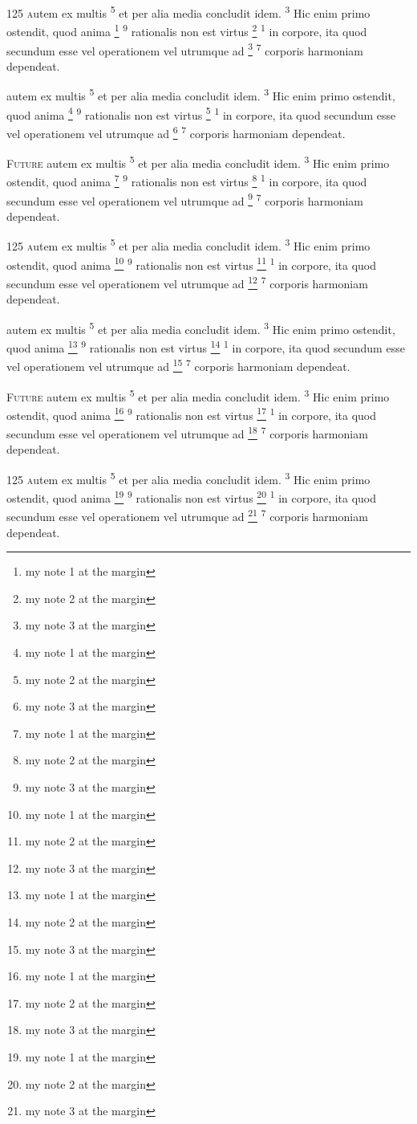 \documentclass[twoside,12pt]{book}
\newcommand{\blGetVerse}[1]{%
\setcounter{footnote}{0}%
\textsuperscript{#1}%
}
\newcommand{\blGetVerseX}[2]{%
\footnote{#2}\blGetVerse{#1}%
}
\newcommand{\blIniChar}[1]{%
\blSetAcorn\selectfont{#1}%
}
\newcommand{\blIniWord}[1]{%
\blSetRothenburgDecorative\selectfont{#1}%
}
\newcommand{\blIniNum}[1]{%
\blSetDSRomantiques\selectfont{#1}%
}
\begin{document}
\lettrine{125 }
autem ex multis \blGetVerse{5}et per alia media concludit idem. \blGetVerse{3}Hic enim primo ostendit, quod anima \blGetVerseX{9}{my note 1 at the margin}rationalis 
non est virtus \blGetVerseX{1}{my note 2 at the margin}in corpore, ita quod secundum esse vel
operationem vel utrumque ad \blGetVerseX{7}{my note 3 at the margin}corporis harmoniam dependeat.

\lettrine{\blIniChar{FU}}{\blIniWord{turo}}
autem ex multis \blGetVerse{5}et per alia media concludit idem. \blGetVerse{3}Hic enim primo ostendit, quod anima \blGetVerseX{9}{my note 1 at the margin}rationalis 
non est virtus \blGetVerseX{1}{my note 2 at the margin}in corpore, ita quod secundum esse vel
operationem vel utrumque ad \blGetVerseX{7}{my note 3 at the margin}corporis harmoniam dependeat.

\lettrine{\blIniNum{150}}{Future}
autem ex multis \blGetVerse{5}et per alia media concludit idem. \blGetVerse{3}Hic enim primo ostendit, quod anima \blGetVerseX{9}{my note 1 at the margin}rationalis 
non est virtus \blGetVerseX{1}{my note 2 at the margin}in corpore, ita quod secundum esse vel
operationem vel utrumque ad \blGetVerseX{7}{my note 3 at the margin}corporis harmoniam dependeat.

\lettrine{125 }
autem ex multis \blGetVerse{5}et per alia media concludit idem. \blGetVerse{3}Hic enim primo ostendit, quod anima \blGetVerseX{9}{my note 1 at the margin}rationalis 
non est virtus \blGetVerseX{1}{my note 2 at the margin}in corpore, ita quod secundum esse vel
operationem vel utrumque ad \blGetVerseX{7}{my note 3 at the margin}corporis harmoniam dependeat.

\lettrine{\blIniChar{FU}}{\blIniWord{turo}}
autem ex multis \blGetVerse{5}et per alia media concludit idem. \blGetVerse{3}Hic enim primo ostendit, quod anima \blGetVerseX{9}{my note 1 at the margin}rationalis 
non est virtus \blGetVerseX{1}{my note 2 at the margin}in corpore, ita quod secundum esse vel
operationem vel utrumque ad \blGetVerseX{7}{my note 3 at the margin}corporis harmoniam dependeat.

\lettrine{\blIniNum{150}}{Future}
autem ex multis \blGetVerse{5}et per alia media concludit idem. \blGetVerse{3}Hic enim primo ostendit, quod anima \blGetVerseX{9}{my note 1 at the margin}rationalis 
non est virtus \blGetVerseX{1}{my note 2 at the margin}in corpore, ita quod secundum esse vel
operationem vel utrumque ad \blGetVerseX{7}{my note 3 at the margin}corporis harmoniam dependeat.

\lettrine{125 }
autem ex multis \blGetVerse{5}et per alia media concludit idem. \blGetVerse{3}Hic enim primo ostendit, quod anima \blGetVerseX{9}{my note 1 at the margin}rationalis 
non est virtus \blGetVerseX{1}{my note 2 at the margin}in corpore, ita quod secundum esse vel
operationem vel utrumque ad \blGetVerseX{7}{my note 3 at the margin}corporis harmoniam dependeat.
\end{document}
